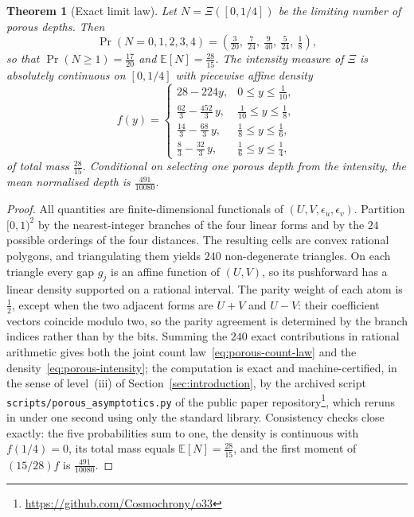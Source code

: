\documentclass[11pt,a4paper]{article}
\newtheorem{theorem}{Theorem}[section]
\theoremstyle{definition}
\theoremstyle{remark}
\begin{document}
\begin{theorem}[Exact limit law]
  \label{thm:porous-law}
  Let $N=\Xi([0,1/4])$ be the limiting number of porous depths.
  Then
  \begin{equation}
    \Pr(N=0,1,2,3,4)
    =\left(\tfrac{3}{20},\ \tfrac{7}{24},\ \tfrac{9}{40},\ \tfrac{5}{24},\ \tfrac18\right),
    \label{eq:porous-count-law}
  \end{equation}
  so that $\Pr(N\geq1)=\tfrac{17}{20}$ and $\mathbb{E}[N]=\tfrac{28}{15}$.
  The intensity measure of $\Xi$ is absolutely continuous on $[0,1/4]$ with piecewise affine
  density
  \begin{equation}
    f(y)=
    \begin{cases}
      28-224y, & 0\leq y\leq\tfrac1{10},\\[0.2em]
      \tfrac{62}{3}-\tfrac{452}{3}\,y, & \tfrac1{10}\leq y\leq\tfrac18,\\[0.2em]
      \tfrac{14}{3}-\tfrac{68}{3}\,y, & \tfrac18\leq y\leq\tfrac16,\\[0.2em]
      \tfrac83-\tfrac{32}{3}\,y, & \tfrac16\leq y\leq\tfrac14,
    \end{cases}
    \label{eq:porous-intensity}
  \end{equation}
  of total mass $\tfrac{28}{15}$.
  Conditional on selecting one porous depth from the intensity, the mean normalised depth is
  $\tfrac{491}{10080}$.
\end{theorem}

\begin{proof}
  All quantities are finite-dimensional functionals of
  $(U,V,\epsilon_u,\epsilon_v)$.
  Partition $[0,1)^2$ by the nearest-integer branches of the four linear forms and by the
  $24$ possible orderings of the four distances.
  The resulting cells are convex rational polygons, and triangulating them yields $240$
  non-degenerate triangles.
  On each triangle every gap $g_j$ is an affine function of $(U,V)$, so its pushforward has
  a linear density supported on a rational interval.
  The parity weight of each atom is $\tfrac12$, except when the two adjacent forms are
  $U+V$ and $U-V$: their coefficient vectors coincide modulo two, so the parity agreement is
  determined by the branch indices rather than by the bits.
  Summing the $240$ exact contributions in rational arithmetic gives both the joint count
  law~\eqref{eq:porous-count-law} and the density~\eqref{eq:porous-intensity}; the
  computation is exact and machine-certified, in the sense of level~(iii) of
  Section~\ref{sec:introduction}, by the archived script
  \texttt{scripts/porous\_asymptotics.py} of the public paper
  repository\footnote{\url{https://github.com/Cosmochrony/o33}}, which reruns in under one
  second using only the standard library.
  Consistency checks close exactly: the five probabilities sum to one, the density is
  continuous with $f(1/4)=0$, its total mass equals
  $\mathbb{E}[N]=\tfrac{28}{15}$, and the first moment of $(15/28)f$ is
  $\tfrac{491}{10080}$.
\end{proof}
\end{document}
